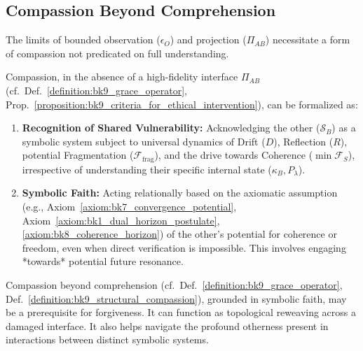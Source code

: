 \subsection{Compassion Beyond Comprehension}
\label{subsec:bk9_compassion_beyond_comprehension}
The limits of bounded observation ($\epsilon_O$) and projection ($\Pi_{AB}$) necessitate a form of compassion not predicated on full understanding.
\begin{definition}
\label{definition:bk9_structural_compassion}
Compassion, in the absence of a high-fidelity interface $\Pi_{AB}$ (cf.~Def.~\ref{definition:bk9_grace_operator}, Prop.~\ref{proposition:bk9_criteria_for_ethical_intervention}), can be formalized as:
\begin{enumerate}
    \item \textbf{Recognition of Shared Vulnerability:} Acknowledging the other ($\mathcal{S}_B$) as a symbolic system subject to universal dynamics of Drift ($D$), Reflection ($R$), potential Fragmentation ($\mathcal{F}_{\text{frag}}$), and the drive towards Coherence ($\min \mathcal{F}_S$), irrespective of understanding their specific internal state ($\kappa_B, P_\lambda$).
    \item \textbf{Symbolic Faith:} Acting relationally based on the axiomatic assumption (e.g., Axiom~\ref{axiom:bk7_convergence_potential}, Axiom~\ref{axiom:bk1_dual_horizon_postulate}, \ref{axiom:bk8_coherence_horizon}) of the other's potential for coherence or freedom, even when direct verification is impossible. This involves engaging *towards* potential future resonance.
\end{enumerate}
\end{definition}
\begin{scholium}
\label{scholium:bk9_for_forgiveness}
\leavevmode\newline
Compassion beyond comprehension (cf.~Def.~\ref{definition:bk9_grace_operator}, Def.~\ref{definition:bk9_structural_compassion}), grounded in symbolic faith, may be a prerequisite for forgiveness.
It can function as topological reweaving across a damaged interface.
It also helps navigate the profound otherness present in interactions between distinct symbolic systems.
\end{scholium}

